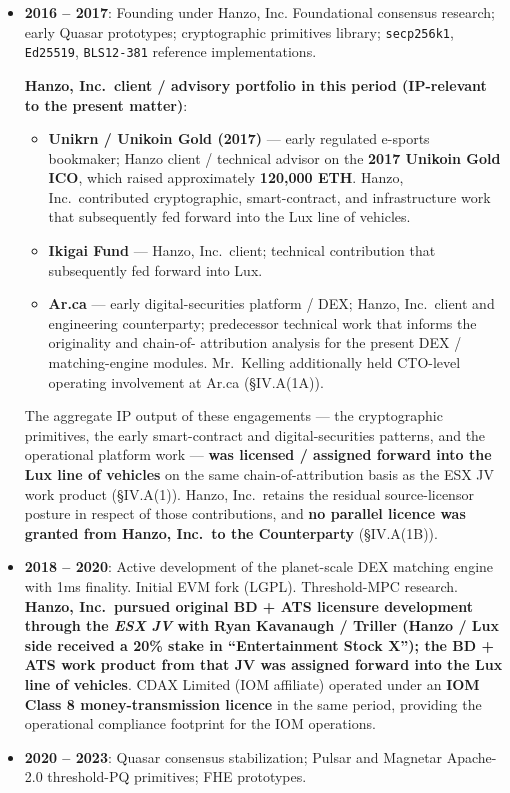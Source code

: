 \documentclass[11pt,letterpaper]{article}
\begin{document}
\begin{itemize}[leftmargin=2em,itemsep=0.1em]
\item \textbf{2016 -- 2017}: Founding under Hanzo, Inc. Foundational
consensus research; early Quasar prototypes; cryptographic
primitives library; \texttt{secp256k1}, \texttt{Ed25519},
\texttt{BLS12-381} reference implementations.

\textbf{Hanzo, Inc.\ client / advisory portfolio in this period
(IP-relevant to the present matter)}:

\begin{itemize}[leftmargin=2em,itemsep=0.05em]
\item \textbf{Unikrn / Unikoin Gold (2017)} --- early regulated
e-sports bookmaker; Hanzo client / technical advisor on the
\textbf{2017 Unikoin Gold ICO}, which raised approximately
\textbf{120,000 ETH}. Hanzo, Inc.\ contributed cryptographic,
smart-contract, and infrastructure work that subsequently fed
forward into the Lux line of vehicles.
\item \textbf{Ikigai Fund} --- Hanzo, Inc.\ client; technical
contribution that subsequently fed forward into Lux.
\item \textbf{Ar.ca} --- early digital-securities platform / DEX;
Hanzo, Inc.\ client and engineering counterparty; predecessor
technical work that informs the originality and chain-of-
attribution analysis for the present DEX / matching-engine
modules. Mr.\ Kelling additionally held CTO-level operating
involvement at Ar.ca (\S IV.A(1A)).
\end{itemize}

The aggregate IP output of these engagements --- the cryptographic
primitives, the early smart-contract and digital-securities
patterns, and the operational platform work --- \textbf{was
licensed / assigned forward into the Lux line of vehicles} on the
same chain-of-attribution basis as the ESX JV work product
(\S IV.A(1)). Hanzo, Inc.\ retains the residual source-licensor
posture in respect of those contributions, and \textbf{no parallel
licence was granted from Hanzo, Inc.\ to the Counterparty}
(\S IV.A(1B)).
\item \textbf{2018 -- 2020}: Active development of the planet-scale
DEX matching engine with 1ms finality. Initial EVM fork (LGPL).
Threshold-MPC research. \textbf{Hanzo, Inc.\ pursued original BD +
ATS licensure development through the \emph{ESX JV} with Ryan
Kavanaugh / Triller (Hanzo / Lux side received a 20\% stake in
``Entertainment Stock X''); the BD + ATS work product from that JV
was assigned forward into the Lux line of vehicles}. CDAX Limited
(IOM affiliate) operated under an \textbf{IOM Class 8
money-transmission licence} in the same period, providing the
operational compliance footprint for the IOM operations.
\item \textbf{2020 -- 2023}: Quasar consensus stabilization; Pulsar
and Magnetar Apache-2.0 threshold-PQ primitives; FHE prototypes.


\end{itemize}
\end{document}
